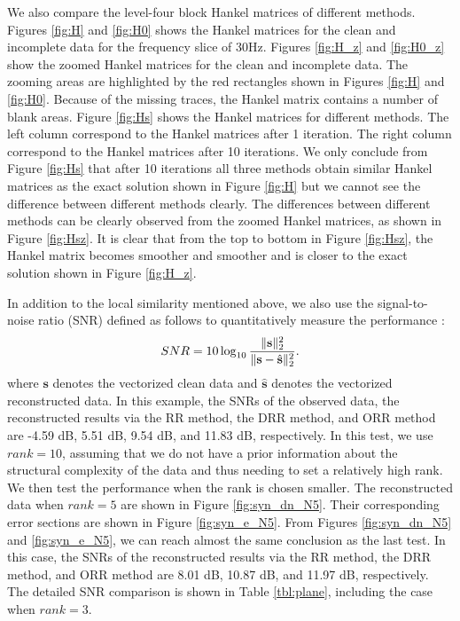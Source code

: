We also compare the level-four block Hankel matrices of different methods. Figures \ref{fig:H} and \ref{fig:H0} shows the Hankel matrices for the clean and incomplete data for the frequency slice of 30Hz. Figures \ref{fig:H_z} and \ref{fig:H0_z} show the zoomed Hankel matrices for the clean and incomplete data. The zooming areas are highlighted by the red rectangles shown in Figures \ref{fig:H} and \ref{fig:H0}. Because of the missing traces, the Hankel matrix contains a number of blank areas. Figure \ref{fig:Hs} shows the Hankel matrices for different methods. The left column correspond to the Hankel matrices after 1 iteration. The right column correspond to the Hankel matrices after 10 iterations. We only conclude from Figure \ref{fig:Hs} that after 10 iterations all three methods obtain similar Hankel matrices as the exact solution shown in Figure \ref{fig:H} but we cannot see the difference between different methods clearly. The differences between different methods can be clearly observed from the zoomed Hankel matrices, as shown in Figure \ref{fig:Hsz}. It is clear that from the top to bottom in Figure \ref{fig:Hsz}, the Hankel matrix becomes smoother and smoother and is closer to the exact solution shown in Figure \ref{fig:H_z}. 

In addition to the local similarity mentioned above, we also use the signal-to-noise ratio (SNR) defined as follows to quantitatively measure the performance \cite[]{weilin2016,yangkang2017sgk,weilin2017gji}:
\begin{equation}
\label{eq:dsnr}
SNR=10\log_{10}\frac{\Arrowvert \mathbf{s} \Arrowvert_2^2}{\Arrowvert \mathbf{s} -\hat{\mathbf{s}}\Arrowvert_2^2}.
\end{equation}
where $\mathbf{s}$ denotes the vectorized clean data and $\hat{\mathbf{s}}$ denotes the vectorized reconstructed data. In this example, the SNRs of the observed data, the reconstructed results via the RR method, the DRR method, and ORR method are -4.59 dB, 5.51 dB, 9.54 dB, and 11.83 dB, respectively. In this test, we use $rank=10$, assuming that we do not have a prior information about the structural complexity of the data and thus needing to set a relatively high rank. We then test the performance when the rank is chosen smaller. The reconstructed data when $rank=5$ are shown in Figure \ref{fig:syn_dn_N5}. Their corresponding error sections are shown in Figure \ref{fig:syn_e_N5}. From Figures \ref{fig:syn_dn_N5} and \ref{fig:syn_e_N5}, we can reach almost the same conclusion as the last test. In this case, the SNRs of the reconstructed results via the RR method, the DRR method, and ORR method are 8.01 dB, 10.87 dB, and 11.97 dB, respectively. The detailed SNR comparison is shown in Table \ref{tbl:plane}, including the case when $rank=3$. 


